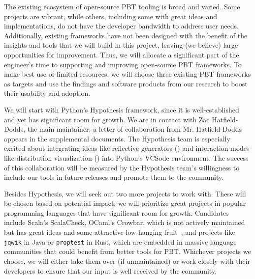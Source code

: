 The existing ecosystem of open-source PBT tooling is broad and varied. Some
projects are vibrant, while others, including some with
great ideas and implementations, do not have the developer bandwidth to address
user needs. Additionally, existing frameworks have not been designed with
the benefit of the insights and tools that we will build in this
project, leaving (we believe) large opportunities for improvement.
Thus, we will allocate a significant part of the engineer's time to
supporting and improving open-source PBT frameworks.
%
To make best use of limited resources, we will choose three existing PBT
frameworks as targets and use the findings and software products from
our research to boost their usability and adoption.

We will start
with Python's Hypothesis framework, since it is well-established and yet has
significant room for growth.  We are in contact with Zac Hatfield-Dodds, the
main maintainer; a letter of collaboration from Mr.{}
Hatfield-Dodds appears in the supplemental documents. The Hypothesis team is
especially excited about integrating ideas like reflective generators
() and interaction modes like distribution
visualization () into Python's VCSode environment.
The success of this collaboration will be measured by the Hypothesis team's
willingness to include our tools in future releases and promote them to the
community.

Besides Hypothesis, we will seek out two more projects to work with. These
will be chosen based on potential impact: we will prioritize great
projects in popular programming languages that have significant room
for growth. Candidates include
Scala's ScalaCheck,
OCaml's Crowbar, which is not actively maintained but has great ideas and
some attractive low-hanging fruit~\cite{noauthor_shrinking_nodate}, and projects like
\lstinline{jqwik} in Java or \lstinline{proptest} in Rust, which are
embedded in massive language
communities that could benefit from better tools for PBT. Whichever
projects we choose, we will either take them over (if
unmaintained) or work closely with their
developers to ensure that our input is well received by the community.

